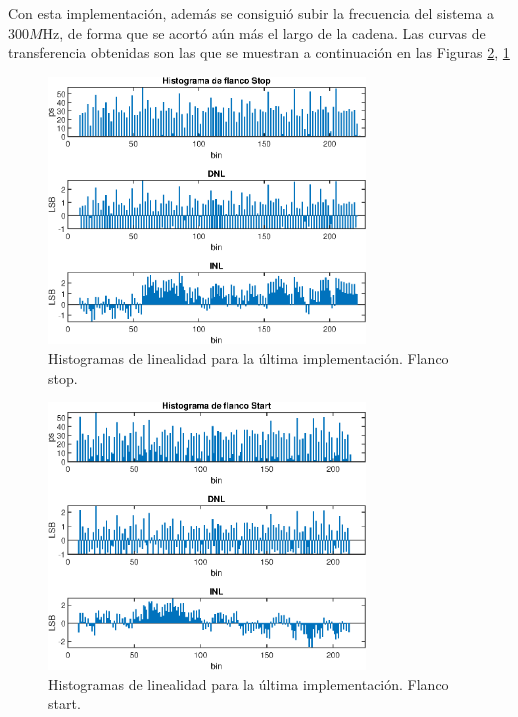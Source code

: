  Con esta implementación, además se consiguió subir la frecuencia del sistema a $300M$Hz, de forma que se acortó 
 aún más el largo de la cadena. Las curvas de transferencia obtenidas son las que se muestran a continuación 
 en las Figuras \ref{fig: transferencia_start_med5}, \ref{fig: transferencia_stop_med5}

 \begin{figure}[H]
      \centering
      \includegraphics[width=0.75\textwidth]{imagenes/linealidad_stop_med5.eps}
      \caption{Histogramas de linealidad para la última implementación. Flanco stop.}
      \label{fig: transferencia_stop_med5}
 \end{figure}
 \begin{figure}[H]
     \centering
     \includegraphics[width=0.75\textwidth]{imagenes/linealidad_start_med5.eps}
     \caption{Histogramas de linealidad para la última implementación. Flanco start.}
     \label{fig: transferencia_start_med5}
\end{figure}

